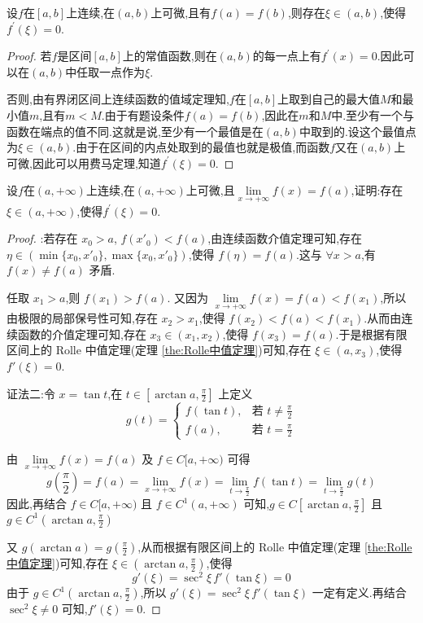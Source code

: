 \documentclass[lang=cn,newtx,10pt,scheme=chinese]{../Template/elegantbook}
\begin{document}
\begin{theorem}\label{the:Rolle中值定理}
    设$f$在$[a,b]$上连续,在$(a,b)$上可微,且有$f(a)=f(b)$,则存在$\xi\in(a,b)$,使得$f^{\prime}(\xi)=0$.
\end{theorem}
\begin{proof}
    若$f$是区间$[a,b]$上的常值函数,则在$(a,b)$的每一点上有$f^{\prime}(x)=0$.因此可以在$(a,b)$中任取一点作为$\xi$.
    
    否则,由有界闭区间上连续函数的值域定理知,$f$在$[a,b]$上取到自己的最大值$M$和最小值$m$,且有$m< M$.由于有题设条件$f(a)=f(b)$,因此在$m$和$M$中.至少有一个与函数在端点的值不同.这就是说,至少有一个最值是在$(a,b)$中取到的.设这个最值点为$\xi\in(a,b)$.由于在区间的内点处取到的最值也就是极值,而函数$f$又在$(a,b)$上可微,因此可以用费马定理,知道$f^{\prime}(\xi)=0$.
\end{proof}

\begin{theorem}\label{the:Rolle中值定理在无限区间上的推广}
    设$f$在$(a,+\infty)$上连续,在$(a,+\infty)$上可微,且$\lim\limits_{x\rightarrow +\infty}f(x)=f(a)$,证明:存在$\xi\in(a,+\infty)$,使得$f^{\prime}(\xi)=0$.
\end{theorem}

\begin{proof}
    {\color{blue} }:若存在 $x_0 > a$, $f(x'_0) < f(a)$,由连续函数介值定理可知,存在 $\eta \in (\min\{x_0, x'_0\}, \max\{x_0, x'_0\})$,使得 $f(\eta) = f(a)$.这与 $\forall x > a$,有 $f(x) \neq f(a)$ 矛盾.

    任取 $x_1 > a$,则 $f(x_1) > f(a)$.
    又因为 $\lim\limits_{x \to +\infty} f(x) = f(a) < f(x_1)$,所以由极限的局部保号性可知,存在 $x_2 > x_1$,使得 $f(x_2) < f(a) < f(x_1)$.从而由连续函数的介值定理可知,存在 $x_3 \in (x_1, x_2)$,使得 $f(x_3) = f(a)$.于是根据有限区间上的 Rolle 中值定理(定理 \ref{the:Rolle中值定理})可知,存在 $\xi \in (a, x_3)$,使得 $f'(\xi) = 0$.

    证法二:令 $x = \tan t$,在 $t \in [\arctan a, \frac{\pi}{2}]$ 上定义
    \[
    g(t) =
    \begin{cases}
        f(\tan t), & \text{若 } t \neq \frac{\pi}{2} \\
        f(a), & \text{若 } t = \frac{\pi}{2}
    \end{cases}
    \]
    
    由 $\lim\limits_{x \to +\infty} f(x) = f(a)$ 及 $f \in C[a, +\infty)$ 可得
    \[
    g\left( \frac{\pi}{2} \right) = f(a) = \lim_{x \to +\infty} f(x) = \lim_{t \to \frac{\pi}{2}} f(\tan t) = \lim_{t \to \frac{\pi}{2}} g(t)
    \]
    因此,再结合 $f \in C[a, +\infty)$ 且 $f \in C^1(a, +\infty)$ 可知,$g \in C[\arctan a, \frac{\pi}{2}]$ 且 $g \in C^1(\arctan a, \frac{\pi}{2})$

    又 $g(\arctan a) = g\left( \frac{\pi}{2} \right)$,从而根据有限区间上的 Rolle 中值定理(定理 \ref{the:Rolle中值定理})可知,存在 $\xi \in (\arctan a, \frac{\pi}{2})$,使得
    \[
    g'(\xi) = \sec^2 \xi \, f'(\tan \xi) = 0
    \]
    由于 $g \in C^1(\arctan a, \frac{\pi}{2})$,所以 $g'(\xi) = \sec^2 \xi \, f'(\tan \xi)$ 一定有定义.再结合 $\sec^2 \xi \neq 0$ 可知,$f'(\xi) = 0$.
\end{proof}
\end{document}
